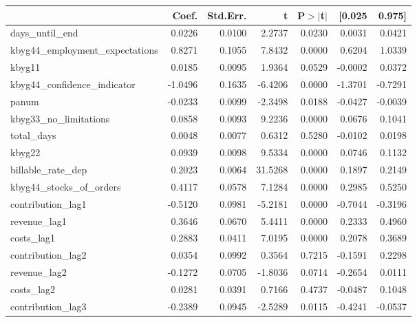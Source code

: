 \begin{table}
\begin{center}
\begin{tabular}{lrrrrrr}
\hline
                                   &   Coef. & Std.Err. &       t & P$> |$t$|$ &  [0.025 &  0.975]  \\
\hline
days\_until\_end                   &  0.0226 &   0.0100 &  2.2737 &      0.0230 &  0.0031 &  0.0421  \\
kbyg44\_employment\_expectations   &  0.8271 &   0.1055 &  7.8432 &      0.0000 &  0.6204 &  1.0339  \\
kbyg11                             &  0.0185 &   0.0095 &  1.9364 &      0.0529 & -0.0002 &  0.0372  \\
kbyg44\_confidence\_indicator      & -1.0496 &   0.1635 & -6.4206 &      0.0000 & -1.3701 & -0.7291  \\
panum                              & -0.0233 &   0.0099 & -2.3498 &      0.0188 & -0.0427 & -0.0039  \\
kbyg33\_no\_limitations            &  0.0858 &   0.0093 &  9.2236 &      0.0000 &  0.0676 &  0.1041  \\
total\_days                        &  0.0048 &   0.0077 &  0.6312 &      0.5280 & -0.0102 &  0.0198  \\
kbyg22                             &  0.0939 &   0.0098 &  9.5334 &      0.0000 &  0.0746 &  0.1132  \\
billable\_rate\_dep                &  0.2023 &   0.0064 & 31.5268 &      0.0000 &  0.1897 &  0.2149  \\
kbyg44\_stocks\_of\_orders         &  0.4117 &   0.0578 &  7.1284 &      0.0000 &  0.2985 &  0.5250  \\
contribution\_lag1                 & -0.5120 &   0.0981 & -5.2181 &      0.0000 & -0.7044 & -0.3196  \\
revenue\_lag1                      &  0.3646 &   0.0670 &  5.4411 &      0.0000 &  0.2333 &  0.4960  \\
costs\_lag1                        &  0.2883 &   0.0411 &  7.0195 &      0.0000 &  0.2078 &  0.3689  \\
contribution\_lag2                 &  0.0354 &   0.0992 &  0.3564 &      0.7215 & -0.1591 &  0.2298  \\
revenue\_lag2                      & -0.1272 &   0.0705 & -1.8036 &      0.0714 & -0.2654 &  0.0111  \\
costs\_lag2                        &  0.0281 &   0.0391 &  0.7166 &      0.4737 & -0.0487 &  0.1048  \\
contribution\_lag3                 & -0.2389 &   0.0945 & -2.5289 &      0.0115 & -0.4241 & -0.0537  \\

\end{tabular}
\end{center}
\end{table}
